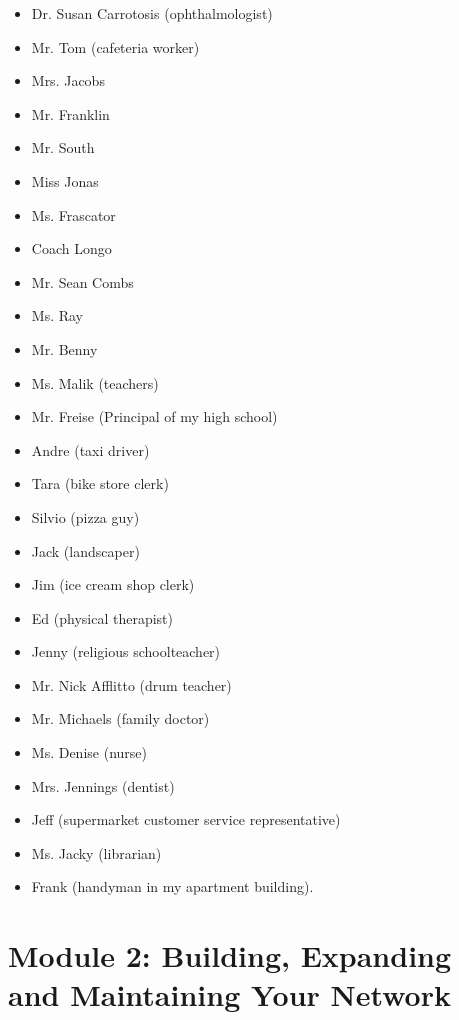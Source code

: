 \begin{multicols}{2}
\begin{itemize}[leftmargin=*]
\item Dr. Susan Carrotosis \break(ophthalmologist)
 \item Mr. Tom \break(cafeteria worker)
 \item Mrs. Jacobs
 \item Mr. Franklin
 \item Mr. South
 \item Miss Jonas
 \item Ms. Frascator
 \item Coach Longo
 \item Mr. Sean Combs
 \item Ms. Ray
 \item Mr. Benny
 \item Ms. Malik \break(teachers)
 \item Mr. Freise \break(Principal of my high school)
 \item Andre \break(taxi driver)
 \item Tara \break(bike store clerk)
 \item Silvio \break(pizza guy)
 \item Jack \break(landscaper)
 \item Jim \break(ice cream shop clerk)
 \item Ed \break(physical therapist)
 \item Jenny \break(religious schoolteacher)
 \item Mr. Nick Afflitto \break(drum teacher)
 \item Mr. Michaels \break(family doctor)
 \item Ms. Denise \break(nurse)
 \item Mrs. Jennings \break(dentist)
 \item Jeff \break(supermarket customer service representative)
 \item Ms. Jacky \break(librarian) 
 \item Frank  \break(handyman in my apartment building).
 \end{itemize}
 \end{multicols}
\pagebreak \section*{Module 2: Building, Expanding and Maintaining Your Network}
\noindent\makebox[\textwidth]{\rule{\linewidth}{0.4pt}} 
\localtableofcontents 
\noindent\makebox[\textwidth]{\rule{\linewidth}{0.4pt}} 


